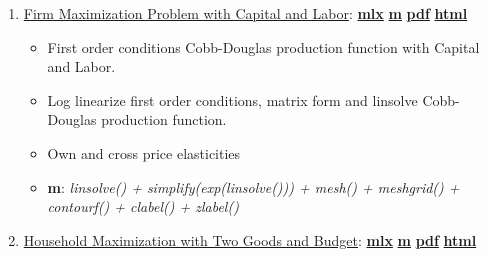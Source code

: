 \documentclass[
]{book}
\providecommand{\tightlist}{%
  \setlength{\itemsep}{0pt}\setlength{\parskip}{0pt}}
\begin{document}
\begin{enumerate}
\def\labelenumi{\arabic{enumi}.}
\tightlist
\item
  \href{https://fanwangecon.github.io/Math4Econ/matrix_application/htmlpdfm/KL_borrowhire_firm.html}{Firm Maximization Problem with Capital and Labor}: \href{https://github.com/FanWangEcon/Math4Econ/blob/master/matrix_application/KL_borrowhire_firm.mlx}{\textbf{mlx}} \textbar{} \href{https://github.com/FanWangEcon/Math4Econ/blob/master/matrix_application/htmlpdfm/KL_borrowhire_firm.m}{\textbf{m}} \textbar{} \href{https://github.com/FanWangEcon/Math4Econ/blob/master/matrix_application/htmlpdfm/KL_borrowhire_firm.pdf}{\textbf{pdf}} \textbar{} \href{https://fanwangecon.github.io/Math4Econ/matrix_application/htmlpdfm/KL_borrowhire_firm.html}{\textbf{html}}

  \begin{itemize}
  \tightlist
  \item
    First order conditions Cobb-Douglas production function with Capital and Labor.
  \item
    Log linearize first order conditions, matrix form and linsolve Cobb-Douglas production function.
  \item
    Own and cross price elasticities
  \item
    \textbf{m}: \emph{linsolve() + simplify(exp(linsolve())) + mesh() + meshgrid() + contourf() + clabel() + zlabel()}
  \end{itemize}
\item
  \href{https://fanwangecon.github.io/Math4Econ/matrix_application/htmlpdfm/twogoods.html}{Household Maximization with Two Goods and Budget}: \href{https://github.com/FanWangEcon/Math4Econ/blob/master/matrix_application/twogoods.mlx}{\textbf{mlx}} \textbar{} \href{https://github.com/FanWangEcon/Math4Econ/blob/master/matrix_application/htmlpdfm/twogoods.m}{\textbf{m}} \textbar{} \href{https://github.com/FanWangEcon/Math4Econ/blob/master/matrix_application/htmlpdfm/twogoods.pdf}{\textbf{pdf}} \textbar{} \href{https://fanwangecon.github.io/Math4Econ/matrix_application/htmlpdfm/twogoods.html}{\textbf{html}}


\end{enumerate}
\end{document}
